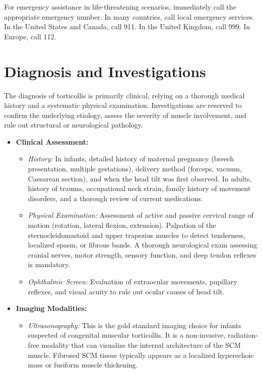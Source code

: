 For emergency assistance in life-threatening scenarios, immediately call the appropriate emergency number. In many countries, call local emergency services. In the United States and Canada, call 911. In the United Kingdom, call 999. In Europe, call 112.

\section*{Diagnosis and Investigations}
The diagnosis of torticollis is primarily clinical, relying on a thorough medical history and a systematic physical examination. Investigations are reserved to confirm the underlying etiology, assess the severity of muscle involvement, and rule out structural or neurological pathology.

\begin{itemize}
    \item \textbf{Clinical Assessment:}
    \begin{itemize}
        \item \textit{History:} In infants, detailed history of maternal pregnancy (breech presentation, multiple gestations), delivery method (forceps, vacuum, Caesarean section), and when the head tilt was first observed. In adults, history of trauma, occupational neck strain, family history of movement disorders, and a thorough review of current medications.
        \item \textit{Physical Examination:} Assessment of active and passive cervical range of motion (rotation, lateral flexion, extension). Palpation of the sternocleidomastoid and upper trapezius muscles to detect tenderness, localized spasm, or fibrous bands. A thorough neurological exam assessing cranial nerves, motor strength, sensory function, and deep tendon reflexes is mandatory.
        \item \textit{Ophthalmic Screen:} Evaluation of extraocular movements, pupillary reflexes, and visual acuity to rule out ocular causes of head tilt.
    \end{itemize}
    \item \textbf{Imaging Modalities:}
    \begin{itemize}
        \item \textit{Ultrasonography:} This is the gold standard imaging choice for infants suspected of congenital muscular torticollis. It is a non-invasive, radiation-free modality that can visualize the internal architecture of the SCM muscle. Fibrosed SCM tissue typically appears as a localized hyperechoic mass or fusiform muscle thickening.

\end{itemize}
\end{itemize}
